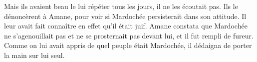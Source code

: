 Mais ils avaient beau le lui répéter tous les jours, il ne les écoutait pas.
Ils le dénoncèrent à Amane, pour voir si Mardochée persisterait dans son attitude.
	Il leur avait fait connaître en effet qu’il était juif.
Amane constata que Mardochée ne s’agenouillait pas et ne se prosternait pas devant lui,
	et il fut rempli de fureur.
Comme on lui avait appris de quel peuple était Mardochée,
	il dédaigna de porter la main sur lui seul.
